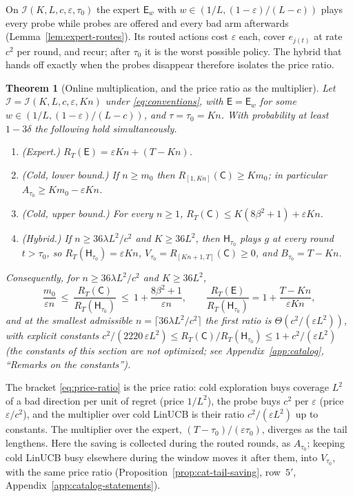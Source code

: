 \documentclass{article}
\newtheorem{theorem}{Theorem}
\theoremstyle{definition}
\theoremstyle{remark}
\newcommand{\eps}{\varepsilon}
\theoremstyle{remark}
\newcommand{\Cold}{\mathsf{C}}
\newcommand{\Exp}{\mathsf{E}}
\newcommand{\Hyb}{\mathsf{H}}
\begin{document}
On $\mathcal I(K,L,c,\eps,\tau_0)$ the expert $\Exp_w$ with
$w\in(1/L,(1-\eps)/(L-c))$ plays every probe while probes are offered and
every bad arm afterwards (Lemma~\ref{lem:expert-routes}). Its routed actions
cost $\eps$ each, cover $e_{j(t)}$ at rate $c^2$ per round, and recur; after
$\tau_0$ it is the worst possible policy. The hybrid that hands off exactly
when the probes disappear therefore isolates the price ratio.

\begin{theorem}[Online multiplication, and the price ratio as the multiplier]
\label{thm:price}
Let $\mathcal I=\mathcal I(K,L,c,\eps,Kn)$ under \eqref{eq:conventions}, with
$\Exp=\Exp_w$ for some $w\in(1/L,(1-\eps)/(L-c))$, and $\tau=\tau_0=Kn$. With
probability at least $1-3\delta$ the following hold simultaneously.
\begin{enumerate}[itemsep=1pt,topsep=1pt,leftmargin=*]
\item[(i)] \emph{(Expert.)} $R_T(\Exp)=\eps Kn+(T-Kn)$.
\item[(ii)] \emph{(Cold, lower bound.)} If $n\ge m_0$ then
$R_{[1,Kn]}(\Cold)\ge Km_0$; in particular $A_{\tau_0}\ge Km_0-\eps Kn$.
\item[(iii)] \emph{(Cold, upper bound.)} For every $n\ge1$, $R_T(\Cold)\le K(8\beta^2+1)+\eps Kn$.
\item[(iv)] \emph{(Hybrid.)} If $n\ge36\lambda L^2/c^2$ and $K\ge36L^2$, then
$\Hyb_{\tau_0}$ plays $g$ at every round $t>\tau_0$, so
$R_T(\Hyb_{\tau_0})=\eps Kn$, $V_{\tau_0}=R_{[Kn+1,T]}(\Cold)\ge0$, and
$B_{\tau_0}=T-Kn$.
\end{enumerate}
Consequently, for $n\ge36\lambda L^2/c^2$ and $K\ge36L^2$,
\begin{equation}
\label{eq:price-ratio}
\frac{m_0}{\eps n}\ \le\ \frac{R_T(\Cold)}{R_T(\Hyb_{\tau_0})}\ \le\ 1+\frac{8\beta^2+1}{\eps n},
\qquad
\frac{R_T(\Exp)}{R_T(\Hyb_{\tau_0})}=1+\frac{T-Kn}{\eps Kn},
\end{equation}
and at the smallest admissible $n=\lceil36\lambda L^2/c^2\rceil$ the first
ratio is $\Theta(c^2/(\eps L^2))$, with explicit constants
$c^2/(2220\,\eps L^2)\le R_T(\Cold)/R_T(\Hyb_{\tau_0})\le1+c^2/(\eps L^2)$
(the constants of this section are not optimized; see
Appendix~\ref{app:catalog}, ``Remarks on the constants'').
\end{theorem}

The bracket \eqref{eq:price-ratio} is the price ratio: cold exploration buys
coverage $L^2$ of a bad direction per unit of regret (price $1/L^2$), the
probe buys $c^2$ per $\eps$ (price $\eps/c^2$), and the multiplier over cold
LinUCB is their ratio $c^2/(\eps L^2)$ up to constants. The multiplier over
the expert, $(T-\tau_0)/(\eps\tau_0)$, diverges as the tail lengthens. Here
the saving is collected during the routed rounds, as $A_{\tau_0}$; keeping
cold LinUCB busy elsewhere during the window moves it after them, into
$V_{\tau_0}$, with the same price ratio (Proposition~\ref{prop:cat-tail-saving},
row~$5'$, Appendix~\ref{app:catalog-statements}).
\end{document}
